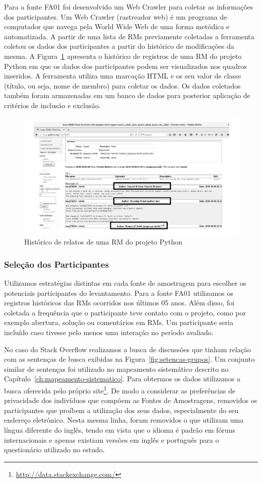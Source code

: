 Para a fonte FA01 foi desenvolvido um Web Crawler para coletar as informações
dos participantes. Um Web Crawler (rastreador web) é um programa de computador
que navega pela World Wide Web de uma forma metódica e automatizada. A partir
de uma lista de RMs previamente coletadas a ferramenta coletou os dados dos
participantes a partir do histórico de modificações da mesma. A
Figura~\ref{fig:historico-rm-python} apresenta o histórico de registros de uma
RM do projeto Python em que os dados dos participantes podem ser visualizados nos
quadros inseridos. A ferramenta utiliza uma marcação HTML e os seu valor de
classe (título, ou seja, nome de membro) para coletar os dados. Os dados
coletados também foram armazenadas em um banco de dados para posterior aplicação
de critérios de inclusão e exclusão.

\begin{figure}[htpb]
	\centering
	\includegraphics[width=0.5\linewidth]{./chapter-pesquisa-com-profissionais/img/historico-rm-python.pdf}
	\caption{Histórico de relatos de uma RM do projeto Python}
\label{fig:historico-rm-python}
\end{figure}

\subsubsection{Seleção dos Participantes}
\label{subsubsec:pesquisa_profissionais_plano_pesquisa}

Utilizamos estratégias distintas em cada fonte de amostragem para escolher os
potenciais participantes do levantamento. Para a fonte FA01 utilizamos os
registros históricos das RMs ocorridos nos últimos 05 anos. Além disso, foi
coletada a frequência que o participante teve contato com o projeto, como por
exemplo abertura, solução ou comentários em RMs. Um participante seria incluído
caso tivesse pelo menos uma interação no período avaliado.

No caso do Stack Overflow realizamos a busca de discussões que tinham relação
com as sentenças de busca exibidas na Figura~\ref{fig:setencas-grupos}. Um
conjunto similar de sentenças foi utilizado no mapeamento sistemático descrito
no Capítulo~\ref{ch:mapeamento-sistematico}. Para obtermos os dados utilizamos a
busca oferecida pelo próprio
site\footnote{\url{http://data.stackexchange.com/}}. De modo a considerar as
preferências de privacidade dos indivíduos que compõem as Fontes de Amostragens,
removidos os participantes que proíbem a utilização dos seus dados,
especialmente do seu endereço eletrônico. Nesta mesma linha, foram removidos o
que utilizam uma língua diferente do inglês, tendo em vista que o idioma é
padrão em fóruns internacionais e apenas existiam versões em inglês e português
para o questionário utilizado no estudo.

